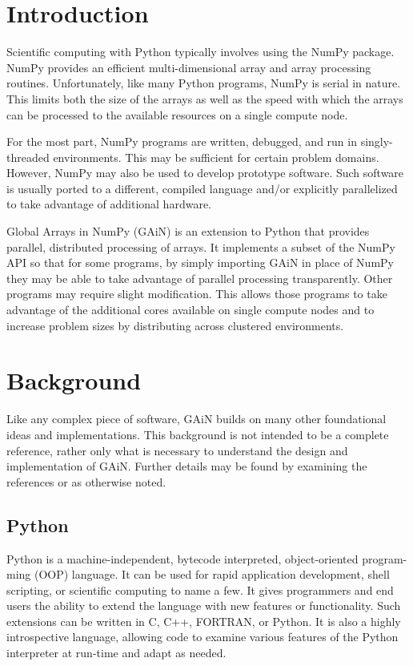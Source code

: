 \documentclass[preprint]{sigplanconf}
\begin{document}
\section{Introduction}

Scientific computing with Python typically involves using the NumPy package.
NumPy provides an efficient multi-dimensional array and array processing
routines. Unfortunately, like many Python programs, NumPy is serial in nature.
This limits both the size of the arrays as well as the speed with which the
arrays can be processed to the available resources on a single compute node.

For the most part, NumPy programs are written, debugged, and run in
singly-threaded environments. This may be sufficient for certain problem
domains. However, NumPy may also be used to develop prototype software. Such
software is usually ported to a different, compiled language and/or explicitly
parallelized to take advantage of additional hardware.

Global Arrays in NumPy (GAiN) is an extension to Python that provides
parallel, distributed processing of arrays. It implements a subset of the
NumPy API so that for some programs, by simply importing GAiN in place of
NumPy they may be able to take advantage of parallel processing transparently.
Other programs may require slight modification. This allows those programs to
take advantage of the additional cores available on single compute nodes and
to increase problem sizes by distributing across clustered environments.

\section{Background}

Like any complex piece of software, GAiN builds on many other foundational
ideas and implementations. This background is not intended to be a complete
reference, rather only what is necessary to understand the design and
implementation of GAiN. Further details may be found by examining the
references or as otherwise noted.

\subsection{Python}

Python \cite{Lun01,Pyt11} is a machine-independent, bytecode interpreted,
object-oriented program- ming (OOP) language. It can be used for rapid
application development, shell scripting, or scientific computing to name a
few. It gives programmers and end users the ability to extend the language
with new features or functionality. Such extensions can be written in C, C++,
FORTRAN, or Python. It is also a highly introspective language, allowing code
to examine various features of the Python interpreter at run-time and adapt as
needed.
\end{document}
